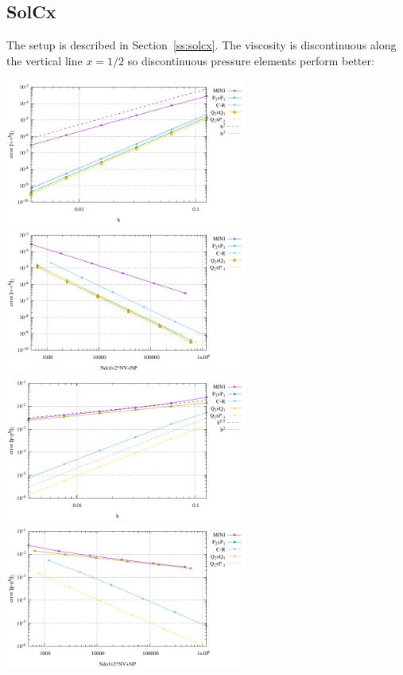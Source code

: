 \newpage
\subsection*{SolCx}

The setup is described in Section~\ref{ss:solcx}. The viscosity is discontinuous 
along the vertical line $x=1/2$ so discontinuous pressure elements perform better:

\begin{center}
\includegraphics[width=8cm]{python_codes/fieldstone_112/results/exp3/errors_V.pdf}
\includegraphics[width=8cm]{python_codes/fieldstone_112/results/exp3/errors_V_ndof.pdf}\\
\includegraphics[width=8cm]{python_codes/fieldstone_112/results/exp3/errors_P.pdf}
\includegraphics[width=8cm]{python_codes/fieldstone_112/results/exp3/errors_P_ndof.pdf}\\

\end{center}
